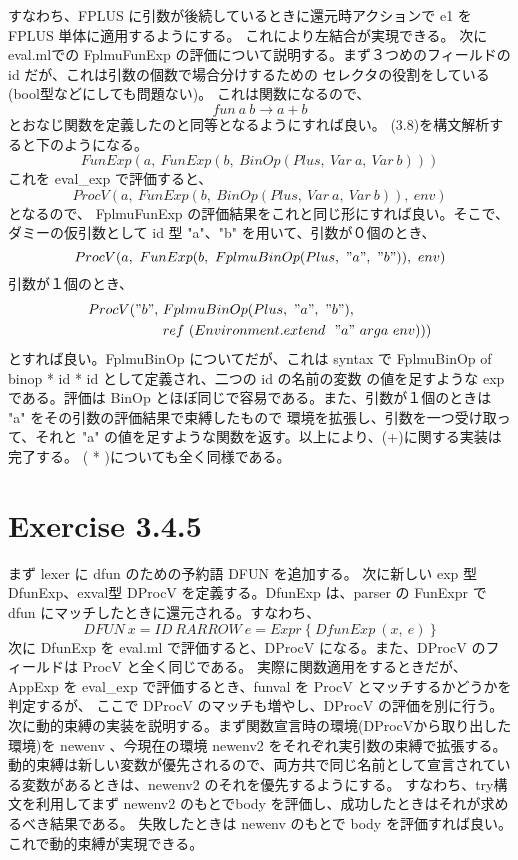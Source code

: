 \documentclass{jreport}
\begin{document}
			すなわち、FPLUS に引数が後続しているときに還元時アクションで e1 を FPLUS 単体に適用するようにする。
			これにより左結合が実現できる。
			次にeval.mlでの FplmuFunExp の評価について説明する。まず３つめのフィールドの id だが、これは引数の個数で場合分けするための
			セレクタの役割をしている(bool型などにしても問題ない)。
			これは関数になるので、
\begin{equation}fun \ a \ b \rightarrow a+b \end{equation} 
			とおなじ関数を定義したのと同等となるようにすれば良い。
			(3.8)を構文解析すると下のようになる。	
\begin{equation}FunExp(a, \ FunExp(b, \ BinOp(Plus, \ Var \ a, \ Var \ b))) \end{equation}	
			これを eval\_exp で評価すると、
\begin{equation}ProcV(a, \ FunExp(b, \ BinOp(Plus, \ Var \ a, \ Var \ b)), \ env) \end{equation}となるので、
			FplmuFunExp の評価結果をこれと同じ形にすれば良い。そこで、ダミーの仮引数として id 型 "a"、"b" を用いて、引数が０個のとき、
\begin{equation}ProcV(a, \ FunExp(b, \ FplmuBinOp(Plus, \ "a", \ "b")), \ env) \end{equation}
			引数が１個のとき、
\begin{equation}\begin{split}ProcV("b", \ &FplmuBinOp(Plus, \ "a", \ "b"), \ \\ &ref \ (Environment.extend \ \ "a" \ arga \ env))) \end{split}\end{equation}
			とすれば良い。FplmuBinOp についてだが、これは syntax で FplmuBinOp of binop * id * id として定義され、二つの id の名前の変数
			の値を足すような exp である。評価は BinOp とほぼ同じで容易である。また、引数が１個のときは "a" をその引数の評価結果で束縛したもので
			環境を拡張し、引数を一つ受け取って、それと "a" の値を足すような関数を返す。以上により、(+)に関する実装は完了する。
			( * )についても全く同様である。
		\section{Exercise 3.4.5}
			まず lexer に dfun のための予約語 DFUN を追加する。
			次に新しい exp 型 DfunExp、exval型 DProcV を定義する。DfunExp は、parser の FunExpr で dfun にマッチしたときに還元される。すなわち、
\begin{equation}DFUN \ x=ID \ RARROW \ e=Expr \ \{ \ DfunExp \ (x, \ e) \ \}\end{equation}
			次に DfunExp を eval.ml で評価すると、DProcV になる。また、DProcV のフィールドは ProcV と全く同じである。
			実際に関数適用をするときだが、AppExp を eval\_exp で評価するとき、funval を ProcV とマッチするかどうかを判定するが、
			ここで DProcV のマッチも増やし、DProcV の評価を別に行う。
			次に動的束縛の実装を説明する。まず関数宣言時の環境(DProcVから取り出した環境)を newenv 、今現在の環境 newenv2 をそれぞれ実引数の束縛で拡張する。
			動的束縛は新しい変数が優先されるので、両方共で同じ名前として宣言されている変数があるときは、newenv2 のそれを優先するようにする。
			すなわち、try構文を利用してまず newenv2 のもとでbody を評価し、成功したときはそれが求めるべき結果である。
			失敗したときは newenv のもとで body を評価すれば良い。これで動的束縛が実現できる。
\end{document}
